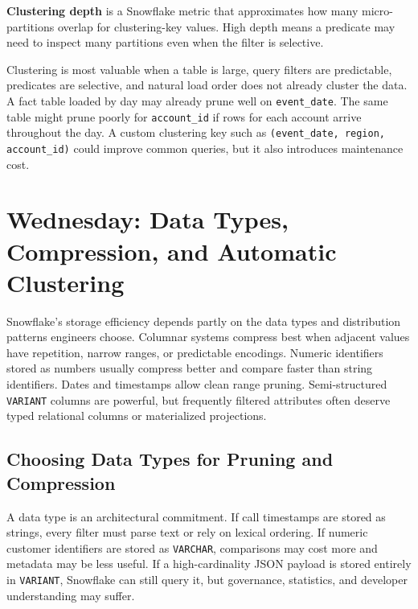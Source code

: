 \begin{definitionbox}
\textbf{Clustering depth} is a Snowflake metric that approximates how many micro-partitions overlap for clustering-key values. High depth means a predicate may need to inspect many partitions even when the filter is selective.
\end{definitionbox}

Clustering is most valuable when a table is large, query filters are predictable, predicates are selective, and natural load order does not already cluster the data. A fact table loaded by day may already prune well on \texttt{event\_date}. The same table might prune poorly for \texttt{account\_id} if rows for each account arrive throughout the day. A custom clustering key such as \texttt{(event\_date, region, account\_id)} could improve common queries, but it also introduces maintenance cost.

\section{Wednesday: Data Types, Compression, and Automatic Clustering}
Snowflake's storage efficiency depends partly on the data types and distribution patterns engineers choose. Columnar systems compress best when adjacent values have repetition, narrow ranges, or predictable encodings. Numeric identifiers stored as numbers usually compress better and compare faster than string identifiers. Dates and timestamps allow clean range pruning. Semi-structured \texttt{VARIANT} columns are powerful, but frequently filtered attributes often deserve typed relational columns or materialized projections.

\subsection{Choosing Data Types for Pruning and Compression}
A data type is an architectural commitment. If call timestamps are stored as strings, every filter must parse text or rely on lexical ordering. If numeric customer identifiers are stored as \texttt{VARCHAR}, comparisons may cost more and metadata may be less useful. If a high-cardinality JSON payload is stored entirely in \texttt{VARIANT}, Snowflake can still query it, but governance, statistics, and developer understanding may suffer.

